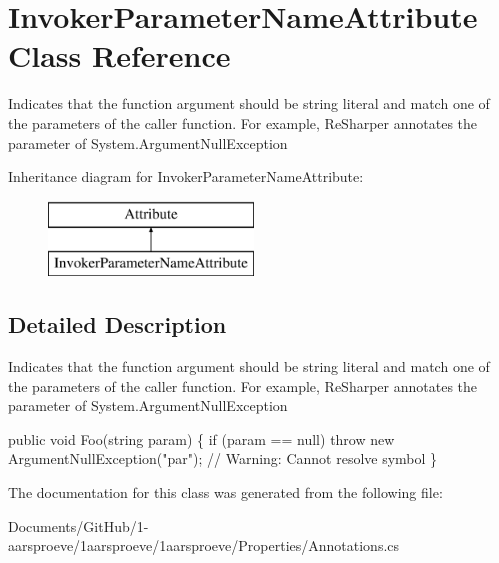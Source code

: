 \hypertarget{class_invoker_parameter_name_attribute}{}\section{Invoker\+Parameter\+Name\+Attribute Class Reference}
\label{class_invoker_parameter_name_attribute}


Indicates that the function argument should be string literal and match one of the parameters of the caller function. For example, Re\+Sharper annotates the parameter of System.\+Argument\+Null\+Exception  


Inheritance diagram for Invoker\+Parameter\+Name\+Attribute\+:\begin{figure}[H]
\begin{center}
\leavevmode
\includegraphics[height=2.000000cm]{class_invoker_parameter_name_attribute}
\end{center}
\end{figure}


\subsection{Detailed Description}
Indicates that the function argument should be string literal and match one of the parameters of the caller function. For example, Re\+Sharper annotates the parameter of System.\+Argument\+Null\+Exception 


\begin{DoxyCode}
\textcolor{keyword}{public} \textcolor{keywordtype}{void} Foo(\textcolor{keywordtype}{string} param) \{
  \textcolor{keywordflow}{if} (param == null)
    \textcolor{keywordflow}{throw} \textcolor{keyword}{new} ArgumentNullException(\textcolor{stringliteral}{"par"}); \textcolor{comment}{// Warning: Cannot resolve symbol}
\}
\end{DoxyCode}


The documentation for this class was generated from the following file\+:\begin{DoxyCompactItemize}
\item 
Documents/\+Git\+Hub/1-\/aarsproeve/1aarsproeve/1aarsproeve/\+Properties/Annotations.\+cs\end{DoxyCompactItemize}
